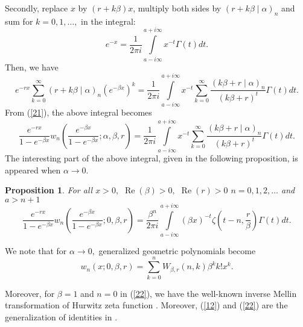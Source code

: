 \documentclass{article}%
\newtheorem{proposition}[theorem]{Proposition}
\begin{document}
Secondly, replace $x$ by $\left(  r+k\beta\right)  x$, multiply both sides by
$\left(  r+k\beta\mid\alpha\right)  _{n}$ and sum for $k=0,1,\ldots,$ in the
integral:%
\[
e^{-x}=\frac{1}{2\pi i}%
{\displaystyle\int\limits_{a-i\infty}^{a+i\infty}}
x^{-t}\Gamma\left(  t\right)  dt.
\]
Then, we have%
\[
e^{-rx}\sum_{k=0}^{\infty}\left(  r+k\beta\mid\alpha\right)  _{n}\left(
e^{-\beta x}\right)  ^{k}=\frac{1}{2\pi i}%
{\displaystyle\int\limits_{a-i\infty}^{a+i\infty}}
x^{-t}\sum_{k=0}^{\infty}\frac{\left(  k\beta+r\mid\alpha\right)  _{n}%
}{\left(  k\beta+r\right)  ^{t}}\Gamma\left(  t\right)  dt.
\]
From (\ref{21}), the above integral becomes%
\[
\frac{e^{-rx}}{1-e^{-\beta x}}w_{n}\left(  \frac{e^{-\beta x}}{1-e^{-\beta x}%
};\alpha,\beta,r\right)  =\frac{1}{2\pi i}%
{\displaystyle\int\limits_{a-i\infty}^{a+i\infty}}
x^{-t}\sum_{k=0}^{\infty}\frac{\left(  k\beta+r\mid\alpha\right)  _{n}%
}{\left(  k\beta+r\right)  ^{t}}\Gamma\left(  t\right)  dt.
\]
The interesting part of the above integral, given in the following
proposition, is appeared when $\alpha\rightarrow0.$

\begin{proposition}
For all $x>0,$ $\operatorname{Re}\left(  \beta\right)  >0,$ $\operatorname{Re}%
\left(  r\right)  >0$ $n=0,1,2,\ldots$ and $a>n+1$%
\begin{equation}
\frac{e^{-rx}}{1-e^{-\beta x}}w_{n}\left(  \frac{e^{-\beta x}}{1-e^{-\beta x}%
};0,\beta,r\right)  =\frac{\beta^{n}}{2\pi i}%
{\displaystyle\int\limits_{a-i\infty}^{a+i\infty}}
\left(  \beta x\right)  ^{-t}\zeta\left(  t-n,\frac{r}{\beta}\right)
\Gamma\left(  t\right)  dt. \label{22}%
\end{equation}

\end{proposition}

We note that for $\alpha\rightarrow0,$ generalized geometric polynomials
become
\[
w_{n}\left(  x;0,\beta,r\right)  =\sum_{k=0}^{n}W_{\beta,r}\left(  n,k\right)
\beta^{k}k!x^{k}.
\]


Moreover, for $\beta=1$ and $n=0$ in (\ref{22}), we have the well-known
inverse Mellin transformation of Hurwitz zeta function \cite[Theorem
12.2]{Apostol}. Moreover, (\ref{12}) and (\ref{22}) are the generalization of
identities in \cite[Proposition 16]{BandDil}.
\end{document}

